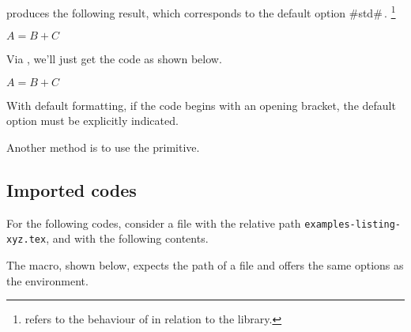 

\begin{tdocexa}[Following]
     produces the following result, which corresponds to the default option \tdocinlatex#std#\,.
    \footnote{
         refers to the  behaviour of  in relation to the  library.
    }

    \begin{tdoclatex}
        $A = B + C$
    \end{tdoclatex}
\end{tdocexa}




\begin{tdocexa}
    Via , we'll just get the code as shown below.

    \begin{tdoclatex}[code]
        $A = B + C$
    \end{tdoclatex}
\end{tdocexa}




\begin{tdocwarn}
    With default formatting, if the code begins with an opening bracket, the default option must be explicitly indicated.


    \smallskip

    Another method is to use the  primitive.

\end{tdocwarn}


\subsection{Imported codes}

For the following codes, consider a file with the relative path \verb+examples-listing-xyz.tex+, and with the following contents.



\medskip

The  macro, shown below, expects the path of a file and offers the same options as the  environment.




